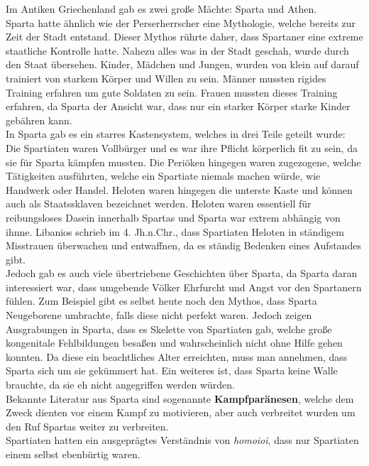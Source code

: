\documentclass{article}
\begin{document}
	Im Antiken Griechenland gab es zwei große Mächte: Sparta und Athen. \\
	Sparta hatte ähnlich wie der Perserherrscher eine Mythologie, welche bereits zur Zeit der Stadt entstand. Dieser Mythos rührte daher, dass Spartaner eine extreme staatliche Kontrolle hatte. Nahezu alles was in der Stadt geschah, wurde durch den Staat übersehen. Kinder, Mädchen und Jungen, wurden von klein auf darauf trainiert von starkem Körper und Willen zu sein. Männer mussten rigides Training erfahren um gute Soldaten zu sein. Frauen mussten dieses Training erfahren, da Sparta der Ansicht war, dass nur ein starker Körper starke Kinder gebähren kann. \\
	In Sparta gab es ein starres Kastensystem, welches in drei Teile geteilt wurde:
	Die Spartiaten waren Vollbürger und es war ihre Pflicht körperlich fit zu sein, da sie für Sparta kämpfen mussten. Die Periöken hingegen waren zugezogene, welche Tätigkeiten ausführten, welche ein Spartiate niemals machen würde, wie Handwerk oder Handel. Heloten waren hingegen die unterste Kaste und können auch als Staatssklaven bezeichnet werden. Heloten waren essentiell für reibungsloses Dasein innerhalb Spartas und Sparta war extrem abhängig von ihnne. Libanios schrieb im 4. Jh.n.Chr., dass Spartiaten Heloten in ständigem Misstrauen überwachen und entwaffnen, da es ständig Bedenken eines Aufstandes gibt. \\
	Jedoch gab es auch viele übertriebene Geschichten über Sparta, da Sparta daran interessiert war, dass umgebende Völker Ehrfurcht und Angst vor den Spartanern fühlen. Zum Beispiel gibt es selbst heute noch den Mythos, dass Sparta Neugeborene umbrachte, falls diese nicht perfekt waren. Jedoch zeigen Ausgrabungen in Sparta, dass es Skelette von Spartiaten gab, welche große kongenitale Fehlbildungen besaßen und wahrscheinlich nicht ohne Hilfe gehen konnten. Da diese ein beachtliches Alter erreichten, muss man annehmen, dass Sparta sich um sie gekümmert hat. Ein weiteres ist, dass Sparta keine Walle brauchte, da sie eh nicht angegriffen werden würden. \\
	Bekannte Literatur aus Sparta sind sogenannte \textbf{Kampfparänesen}, welche dem Zweck dienten vor einem Kampf zu motivieren, aber auch verbreitet wurden um den Ruf Spartas weiter zu verbreiten. \\
	Spartiaten hatten ein ausgeprägtes Verständnis von \textit{homoioi}, dass nur Spartiaten einem selbst ebenbürtig waren. \\
	
\end{document}

